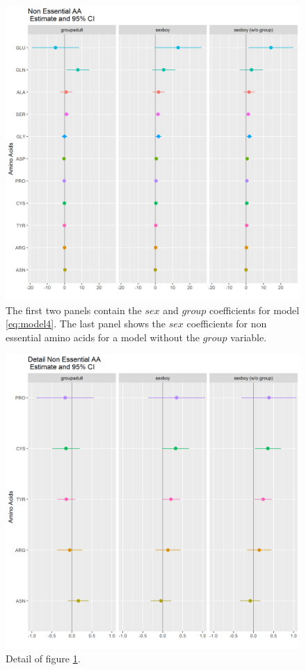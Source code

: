 \documentclass[12pt]{article}
\begin{document}
\begin{figure}[!htb]
  \centering
  \includegraphics[width=\textwidth]{../wANDhc/group_NE.png}
  \caption{The first two panels contain the $sex$ and $group$ coefficients for model \ref{eq:model4}. The last panel shows the $sex$ coefficients for non essential amino acids for a model without the $group$ variable.}
  \label{fig:group_NE}
\end{figure}


\begin{figure}[!htb]
  \centering
  \includegraphics[width=\textwidth]{../wANDhc/group_NE_detail.png}
  \caption{Detail of figure \ref{fig:group_NE}.}
  \label{fig:group_NE_detail}
\end{figure}
\end{document}
